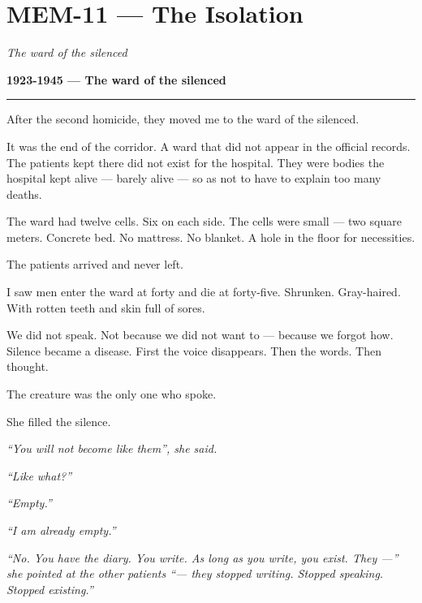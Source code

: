 \section*{\textbf{MEM-11} --- The Isolation}

\noindent \textit{The ward of the silenced}

\noindent \textbf{1923-1945 --- The ward of the silenced}

\vspace{0.5em}\noindent\rule{\textwidth}{0.5pt}\vspace{0.5em}

\noindent After the second homicide, they moved me to the ward of the silenced.

\noindent It was the end of the corridor. A ward that did not appear in the official records. The patients kept there did not exist for the hospital. They were bodies the hospital kept alive --- barely alive --- so as not to have to explain too many deaths.

\noindent The ward had twelve cells. Six on each side. The cells were small --- two square meters. Concrete bed. No mattress. No blanket. A hole in the floor for necessities.

\noindent The patients arrived and never left.

\noindent I saw men enter the ward at forty and die at forty-five. Shrunken. Gray-haired. With rotten teeth and skin full of sores.

\noindent We did not speak. Not because we did not want to --- because we forgot how. Silence became a disease. First the voice disappears. Then the words. Then thought.

\noindent The creature was the only one who spoke.

\noindent She filled the silence.

\noindent \textit{\textquotedblleft{}You will not become like them\textquotedblright{}, she said.}

\noindent \textit{\textquotedblleft{}Like what?\textquotedblright{}}

\noindent \textit{\textquotedblleft{}Empty.\textquotedblright{}}

\noindent \textit{\textquotedblleft{}I am already empty.\textquotedblright{}}

\noindent \textit{\textquotedblleft{}No. You have the diary. You write. As long as you write, you exist. They ---\textquotedblright{}\textit{ she pointed at the other patients }\textquotedblleft{}--- they stopped writing. Stopped speaking. Stopped existing.\textquotedblright{}}

